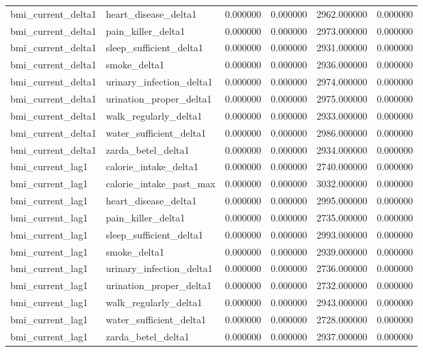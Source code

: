 \begin{longtable}{llrrrr}
bmi\_current\_delta1 & heart\_disease\_delta1 & 0.000000 & 0.000000 & 2962.000000 & 0.000000 \\
bmi\_current\_delta1 & pain\_killer\_delta1 & 0.000000 & 0.000000 & 2973.000000 & 0.000000 \\
bmi\_current\_delta1 & sleep\_sufficient\_delta1 & 0.000000 & 0.000000 & 2931.000000 & 0.000000 \\
bmi\_current\_delta1 & smoke\_delta1 & 0.000000 & 0.000000 & 2936.000000 & 0.000000 \\
bmi\_current\_delta1 & urinary\_infection\_delta1 & 0.000000 & 0.000000 & 2974.000000 & 0.000000 \\
bmi\_current\_delta1 & urination\_proper\_delta1 & 0.000000 & 0.000000 & 2975.000000 & 0.000000 \\
bmi\_current\_delta1 & walk\_regularly\_delta1 & 0.000000 & 0.000000 & 2933.000000 & 0.000000 \\
bmi\_current\_delta1 & water\_sufficient\_delta1 & 0.000000 & 0.000000 & 2986.000000 & 0.000000 \\
bmi\_current\_delta1 & zarda\_betel\_delta1 & 0.000000 & 0.000000 & 2934.000000 & 0.000000 \\
bmi\_current\_lag1 & calorie\_intake\_delta1 & 0.000000 & 0.000000 & 2740.000000 & 0.000000 \\
bmi\_current\_lag1 & calorie\_intake\_past\_max & 0.000000 & 0.000000 & 3032.000000 & 0.000000 \\
bmi\_current\_lag1 & heart\_disease\_delta1 & 0.000000 & 0.000000 & 2995.000000 & 0.000000 \\
bmi\_current\_lag1 & pain\_killer\_delta1 & 0.000000 & 0.000000 & 2735.000000 & 0.000000 \\
bmi\_current\_lag1 & sleep\_sufficient\_delta1 & 0.000000 & 0.000000 & 2993.000000 & 0.000000 \\
bmi\_current\_lag1 & smoke\_delta1 & 0.000000 & 0.000000 & 2939.000000 & 0.000000 \\
bmi\_current\_lag1 & urinary\_infection\_delta1 & 0.000000 & 0.000000 & 2736.000000 & 0.000000 \\
bmi\_current\_lag1 & urination\_proper\_delta1 & 0.000000 & 0.000000 & 2732.000000 & 0.000000 \\
bmi\_current\_lag1 & walk\_regularly\_delta1 & 0.000000 & 0.000000 & 2943.000000 & 0.000000 \\
bmi\_current\_lag1 & water\_sufficient\_delta1 & 0.000000 & 0.000000 & 2728.000000 & 0.000000 \\
bmi\_current\_lag1 & zarda\_betel\_delta1 & 0.000000 & 0.000000 & 2937.000000 & 0.000000 \\

\end{longtable}
